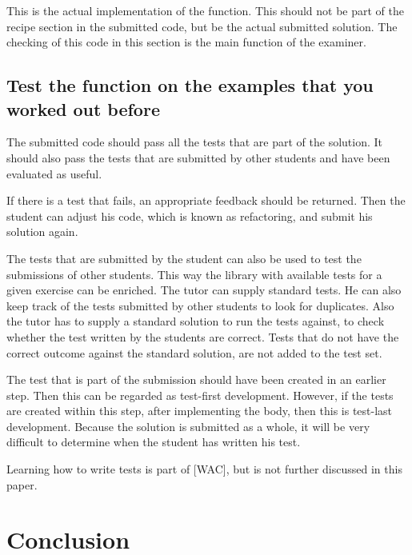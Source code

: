 This is the actual implementation of the function.
This should not be part of the recipe section in the submitted \gls{code}, but be the
actual submitted \gls{solution}.
The checking of this \gls{code} in this section is the main function of the
\gls{examiner}.



\subsection{Test the function on the examples that you worked out before}

The submitted \gls{code} should pass all the tests that are part of the \gls{solution}.
It should also pass the tests that are submitted by other students and have been
evaluated as useful.

If there is a test that fails, an appropriate feedback should be returned.
Then the \gls{student} can adjust his code, which is known as refactoring, and
submit his solution again. 

The tests that are submitted by the \gls{student} can also be used to test the 
submissions of other students. This way the library with available tests for a
given exercise can be enriched.
The \gls{tutor} can supply standard tests. He can also keep track of the tests
submitted by other students to look for duplicates.
Also the \gls{tutor} has to supply a standard \gls{solution} to run the tests against,
to check whether the test written by the students are correct.
Tests that do not have the correct outcome against the standard \gls{solution}, are
not added to the test set.

The test that is part of the submission should have been created in an earlier step.
Then this can be regarded as test-first development. However, if the tests are
created within this step, after implementing the body, then this is test-last
development. Because the solution is submitted as a whole, it will be very difficult
to determine when the \gls{student} has written his test.

Learning how to write tests is part of [WAC], but is not further discussed in
this paper.



\section{Conclusion}


